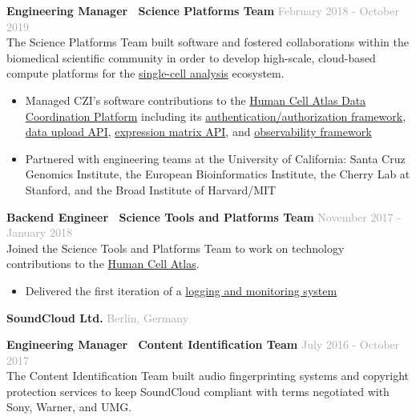 \documentclass[margin,line]{res}
\newenvironment{list1}{
  \begin{list}{\ding{113}}{%
      \setlength{\itemsep}{0in}
      \setlength{\parsep}{0in} \setlength{\parskip}{0in}
      \setlength{\topsep}{0in} \setlength{\partopsep}{0in}
      \setlength{\leftmargin}{0.17in}}}{\end{list}}
\begin{document}
\begin{resume}
\begin{list1}
\item[] {\bf Engineering Manager \textbar ~Science Platforms Team} \hfill \textcolor{darkgray}{February 2018 - October 2019} \vspace{1mm} \\
The Science Platforms Team built software and fostered collaborations within the biomedical scientific community in order to develop high-scale, cloud-based compute platforms for the \href{https://en.wikipedia.org/wiki/Single-cell_analysis}{single-cell analysis} ecosystem.
\begin{itemize}
\item Managed CZI's software contributions to the \href{https://www.humancellatlas.org/data-coordination/}{Human Cell Atlas Data Coordination Platform} including its  \href{https://github.com/HumanCellAtlas/fusillade}{authentication/authorization framework}, \href{https://github.com/HumanCellAtlas/upload-service}{data upload API}, \href{https://github.com/HumanCellAtlas/matrix-service}{expression matrix API}, and \href{https://github.com/HumanCellAtlas/dcp-monitoring}{observability framework}
\item Partnered with engineering teams at the University of California: Santa Cruz Genomics Institute, the European Bioinformatics Institute, the Cherry Lab at Stanford, and the Broad Institute of Harvard/MIT
\end{itemize}

\item[] {\bf Backend Engineer \textbar ~Science Tools and Platforms Team} \hfill \textcolor{darkgray}{November 2017 - January 2018} \vspace{1mm} \\
Joined the Science Tools and Platforms Team to work on technology contributions to the \href{https://www.humancellatlas.org/}{Human Cell Atlas}.
\begin{itemize}
\item Delivered the first iteration of a \href{https://github.com/HumanCellAtlas/logs}{logging and monitoring system}
\end{itemize}
\end{list1}


{\bf SoundCloud Ltd.} \hfill \textcolor{darkgray}{Berlin, Germany}\\
\begin{list1}
\setlength\itemsep{1em}
\item[] {\bf Engineering Manager \textbar \, Content Identification Team} \hfill \textcolor{darkgray}{July 2016 - October 2017} \vspace{1mm} \\
The Content Identification Team built audio fingerprinting systems and copyright protection services to keep SoundCloud compliant with terms negotiated with Sony, Warner, and UMG.


\end{list1}
\end{resume}
\end{document}

